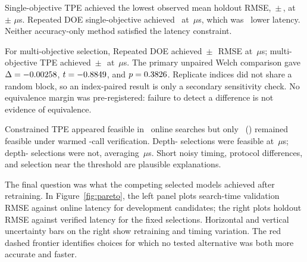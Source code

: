 \documentclass[12pt,a4paper]{article}
\begin{document}
\begin{sloppypar}
Single-objective TPE achieved the lowest observed mean holdout RMSE, \numRevSoTpeTestRMSE\,$\pm$\,\numRevSoTpeTestRMSESd, at \numRevSoTpePredictLat\,$\pm$\,\numRevSoTpePredictLatSd\,$\mu$s. Repeated DOE single-objective achieved \numRevDoeSoTestRMSE\ at \numRevDoeSoPredictLat\,$\mu$s, which was \numRevDoeSoLatLowerPct\ lower latency. Neither accuracy-only method satisfied the latency constraint.

For multi-objective selection, Repeated DOE achieved \numRevDoeMoTestRMSE\,$\pm$\,\numRevDoeMoTestRMSESd\ RMSE at \numRevDoeMoPredictLat\,$\mu$s; multi-objective TPE achieved \numRevMoTpeTestRMSE\,$\pm$\,\numRevMoTpeTestRMSESd\ at \numRevMoTpePredictLat\,$\mu$s. The primary unpaired Welch comparison gave $\Delta=-0.00258$, $t=-0.8849$, and $p=0.3826$. Replicate indices did not share a random block, so an index-paired result is only a secondary sensitivity check. No equivalence margin was pre-registered: failure to detect a difference is not evidence of equivalence.

Constrained TPE appeared feasible in \numRevCtpeSearchFeas\ online searches but only \numRevCtpeBenchFeas\ (\numRevCtpeBenchFeasPct) remained feasible under warmed \numPubPrimaryCalls{}-call verification. Depth-\numPubCtpeShallow{} selections were feasible at \numRevCtpeDepthSixLat\,$\mu$s; depth-\numPubCtpeDeep{} selections were not, averaging \numRevCtpeDepthSevenLat\,$\mu$s. Short noisy timing, protocol differences, and selection near the threshold are plausible explanations.
\end{sloppypar}

The final question was what the competing selected models achieved after retraining. In Figure~\ref{fig:pareto}, the left panel plots search-time validation RMSE against online latency for development candidates; the right plots holdout RMSE against verified latency for the fixed selections. Horizontal and vertical uncertainty bars on the right show retraining and timing variation. The red dashed frontier identifies choices for which no tested alternative was both more accurate and faster.
\end{document}
